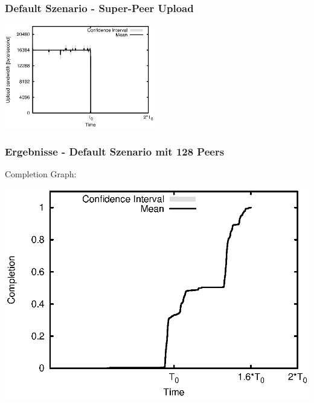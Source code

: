 \begin{frame}
  \frametitle{Default Szenario - Super-Peer Upload}
  \begin{center}
    \includegraphics[width=0.49\textwidth]{fig/plots/scenario_1_default/plots/GeneratedMeanCurrentSuperSeederUploadBandwidth.csv.eps}
  \end{center}
\end{frame}



\begin{frame}
  \frametitle{Ergebnisse - Default Szenario mit 128 Peers}
  Completion Graph:
  
  \begin{center}
    \includegraphics[width=1\textwidth]{fig/plots/scenario_4_peer_count_128/plots/GeneratedMeanChunkCompletion.csv.eps}
  \end{center}
\end{frame}


